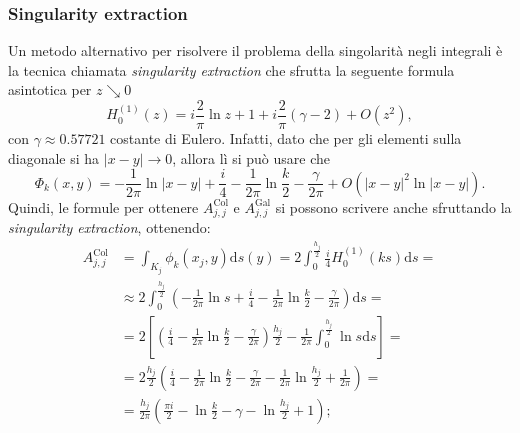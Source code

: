 \subsubsection{Singularity extraction} \label{SingularityExtraction}
Un metodo alternativo per risolvere il problema della singolarità negli integrali è la tecnica chiamata \textit{singularity extraction} che sfrutta la seguente formula asintotica per $z \searrow 0$
\begin{equation}
	H_0^{(1)}(z) = i\frac{2}{\pi}\ln z + 1 + i \frac{2}{\pi} (\gamma-2) + O(z^2),
\end{equation}
con $\gamma \approx 0.57721$ costante di Eulero. Infatti, dato che per gli elementi sulla diagonale si ha $|x-y| \rightarrow 0$, allora lì si può usare che
\begin{equation}
	\Phi_k(x,y) = -\frac{1}{2\pi}\ln|x-y| + \frac{i}{4} - \frac{1}{2\pi}\ln\frac{k}{2} - \frac{\gamma}{2\pi} + O(|x-y|^2\ln|x-y|).
\end{equation}
Quindi, le formule per ottenere $A_{j,j}^{\text{Col}}$ e $A_{j,j}^{\text{Gal}}$ si possono scrivere anche sfruttando la \textit{singularity extraction}, ottenendo:
\begin{align*}
	A_{j,j}^{\text{Col}} &= \int_{K_j} \phi_k(x_j,y) \mathrm{d}s(y) = 2 \int_{0}^{\frac{h_j}{2}} \frac{i}{4} H_0^{(1)} (ks)\mathrm{d}s = \\
	&\approx 2 \int_{0}^{\frac{h_j}{2}} \left( -\frac{1}{2\pi} \ln s + \frac{i}{4} - \frac{1}{2\pi}\ln\frac{k}{2} - \frac{\gamma}{2\pi} \right) \mathrm{d}s = \\
	&= 2 \left[ \left( \frac{i}{4} - \frac{1}{2\pi}\ln\frac{k}{2} - \frac{\gamma}{2\pi} \right) \frac{h_j}{2} - \frac{1}{2\pi} \int_{0}^{\frac{h_j}{2}} \ln s \mathrm{d}s \right] = \\
	&= 2 \frac{h_j}{2} \left( \frac{i}{4} - \frac{1}{2\pi}\ln\frac{k}{2} - \frac{\gamma}{2\pi} - \frac{1}{2\pi}\ln\frac{h_j}{2} + \frac{1}{2\pi} \right) = \\
	&= \frac{h_j}{2\pi} \left( \frac{\pi i}{2} - \ln\frac{k}{2} - \gamma - \ln\frac{h_j}{2} + 1 \right);
\end{align*}
